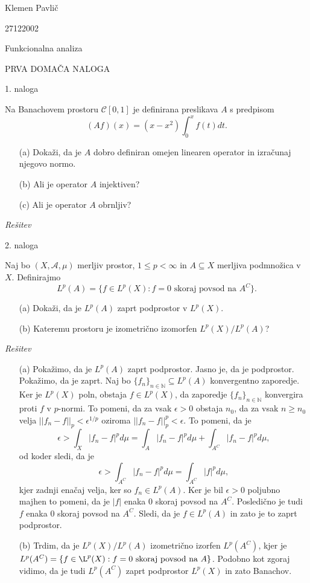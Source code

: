 \documentclass[a4paper, 12pt]{article}
\newcommand{\N}{\mathbb{N}}
\begin{document}
\begin{flushright}
Klemen Pavlič

27122002
\end{flushright}
\begin{center}
Funkcionalna analiza
\end{center}
\begin{center}
PRVA DOMAČA NALOGA
\end{center}

\begin{flushleft}
1. naloga
\end{flushleft}
Na Banachovem prostoru $\mathcal{C}[0,1]$ je definirana preslikava $A$ s predpisom
$$
(Af)(x) = (x-x^2) \int_{0}^x f(t) dt.
$$
\begin{enumerate}
\item[(a)] Dokaži, da je $A$ dobro definiran omejen linearen operator in izračunaj njegovo normo.
\item[(b)] Ali je operator $A$ injektiven?
\item[(c)] Ali je operator $A$ obrnljiv?
\end{enumerate}
\emph{Rešitev}

\begin{flushleft}
2. naloga
\end{flushleft}
Naj bo $(X,\mathcal{A}, \mu )$ merljiv prostor, $1 \le p < \infty$ in $A\subseteq X$ merljiva podmnožica v $X$. Definirajmo
$$
L^p(A) = \{ f\in L^p(X): f = 0 \textrm{ skoraj povsod na } A^C\}.
$$
\begin{enumerate}
\item[(a)] Dokaži, da je $L^p(A)$ zaprt podprostor v $L^p(X)$.
\item[(b)] Kateremu prostoru je izometrično izomorfen $L^p(X) / L^p(A)$?
\end{enumerate}
\emph{Rešitev}
\begin{enumerate}
\item[(a)] Pokažimo, da je $L^p(A)$ zaprt podprostor. Jasno je, da je podprostor. Pokažimo, da je zaprt. Naj bo $\{f_n\}_{n\in \N} \subseteq L^p(A)$ konvergentno zaporedje. Ker je $L^p(X)$ poln, obstaja $f\in L^p(X)$, da zaporedje $\{f_n\}_{n\in\N}$ konvergira proti $f$ v $p$-normi. To pomeni, da za vsak $\epsilon > 0$ obstaja $n_0$, da za vsak $n\ge n_0$ velja $||f_n - f||_p < \epsilon^{1/p}$ oziroma $||f_n - f||_p^p < \epsilon$. To pomeni, da je 
$$
\epsilon > \int_X |f_n - f|^p d\mu = \int_A |f_n - f|^p d\mu + \int_{A^C} |f_n-f|^pd\mu, 
$$
od koder sledi, da je 
$$
\epsilon > \int_{A^C} |f_n-f|^pd\mu = \int_{A^C} |f|^pd\mu, 
$$
kjer zadnji enačaj velja, ker so $f_n \in L^p(A)$. Ker je bil $\epsilon>0$ poljubno majhen to pomeni, da je $|f|$ enaka 0 skoraj povsod na $A^C$. Posledično je tudi $f$ enaka 0 skoraj povsod na $A^C$. Sledi, da je $f\in L^p(A)$ in zato je to zaprt podprostor. 
\item[(b)] Trdim, da je $L^p(X) / L^p(A)$ izometrično izorfen $L^p(A^C)$, kjer je $L^p(A^C)=\{f\in \L^p(X): f=0\textrm{ skoraj povsod na } A\}$. Podobno kot zgoraj vidimo, da je tudi $L^p(A^C)$ zaprt podprostor $L^p(X)$ in zato Banachov.
\end{enumerate}
\end{document}
